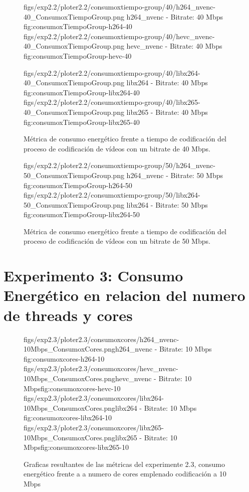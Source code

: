 \begin{figure}[H]
 \centering
 \small
 \dosubfigs
 {figs/exp2.2/ploter2.2/consumoxtiempo-group/40/h264_nvenc-40_ConsumoxTiempoGroup.png}
 {h264\_nvenc - Bitrate: 40 Mbps}
 {fig:consumoxTiempoGroup-h264-40}
 {figs/exp2.2/ploter2.2/consumoxtiempo-group/40/hevc_nvenc-40_ConsumoxTiempoGroup.png}
 {hevc\_nvenc - Bitrate: 40 Mbps}
 {fig:consumoxTiempoGroup-hevc-40}

 \dosubfigs
 {figs/exp2.2/ploter2.2/consumoxtiempo-group/40/libx264-40_ConsumoxTiempoGroup.png}
 {libx264 - Bitrate: 40 Mbps}
 {fig:consumoxTiempoGroup-libx264-40}
 {figs/exp2.2/ploter2.2/consumoxtiempo-group/40/libx265-40_ConsumoxTiempoGroup.png}
 {libx265 - Bitrate: 40 Mbps}
 {fig:consumoxTiempoGroup-libx265-40}

 \caption{Métrica de consumo energético frente a tiempo de codificación del proceso de codificación de vídeos con un bitrate de 40 Mbps.}
\end{figure}


\begin{figure}[H]
 \centering
 \small
 \dosubfigs
 {figs/exp2.2/ploter2.2/consumoxtiempo-group/50/h264_nvenc-50_ConsumoxTiempoGroup.png}
 {h264\_nvenc - Bitrate: 50 Mbps}
 {fig:consumoxTiempoGroup-h264-50}
 {figs/exp2.2/ploter2.2/consumoxtiempo-group/50/libx264-50_ConsumoxTiempoGroup.png}
 {libx264 - Bitrate: 50 Mbps}
 {fig:consumoxTiempoGroup-libx264-50}

 \caption{Métrica de consumo energético frente a tiempo de codificación del proceso de codificación de vídeos con un bitrate de 50 Mbps.}
\end{figure}


 
\section{Experimento 3: Consumo Energético en relacion del numero de threads y cores} \label{apendice:exp2.3-graficas}
     \begin{figure}[H]
      \centering
      \small
      \dosubfigs
      {figs/exp2.3/ploter2.3/consumoxcores/h264_nvenc-10Mbps_ConsumoxCores.png}{h264\_nvenc - Bitrate: 10 Mbps }{fig:consumoxcores-h264-10}
      {figs/exp2.3/ploter2.3/consumoxcores/hevc_nvenc-10Mbps_ConsumoxCores.png}{hevc\_nvenc - Bitrate: 10 Mbps}{fig:consumoxcores-hevc-10}
      \dosubfigs
      {figs/exp2.3/ploter2.3/consumoxcores/libx264-10Mbps_ConsumoxCores.png}{libx264 - Bitrate: 10 Mbps }{fig:consumoxcores-libx264-10}
      {figs/exp2.3/ploter2.3/consumoxcores/libx265-10Mbps_ConsumoxCores.png}{libx265 - Bitrate: 10 Mbps}{fig:consumoxcores-libx265-10}
      \caption{Graficas resultantes de las métricas del experimente 2.3, consumo energético frente a a numero de cores emplenado codificación a 10 Mbps}
      \label{fig-group:consumoxcores-10mps}
     \end{figure}

